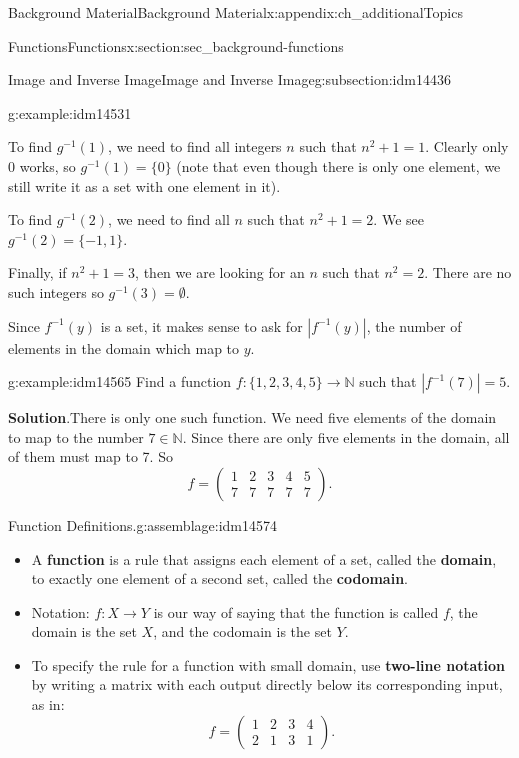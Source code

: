 \documentclass[oneside,10pt,]{book}
\newcommand{\terminology}[1]{\textbf{#1}}
\numberwithin{equation}{chapter}
\def\N{\mathbb N}
\def\inv{^{-1}}
\newcommand{\card}[1]{\left| #1 \right|}
\newcommand{\amp}{&}
\begin{document}
\begin{appendixptx}{Background Material}{}{Background Material}{}{}{x:appendix:ch_additionalTopics}
\begin{sectionptx}{Functions}{}{Functions}{}{}{x:section:sec_background-functions}
\begin{subsectionptx}{Image and Inverse Image}{}{Image and Inverse Image}{}{}{g:subsection:idm14436}
\begin{example}{}{g:example:idm14531}
\par
To find \(g\inv(1)\), we need to find all integers \(n\) such that \(n^2 + 1 = 1\). Clearly only 0 works, so \(g\inv(1) = \{0\}\) (note that even though there is only one element, we still write it as a set with one element in it).%
\par
To find \(g\inv(2)\), we need to find all \(n\) such that \(n^2 + 1 = 2\). We see \(g\inv(2) = \{-1,1\}\).%
\par
Finally, if \(n^2 + 1 = 3\), then we are looking for an \(n\) such that \(n^2 = 2\). There are no such integers so \(g\inv(3) = \emptyset\).%
\end{example}
Since \(f\inv(y)\) is a set, it makes sense to ask for \(\card{f\inv(y)}\), the number of elements in the domain which map to \(y\).%
\begin{example}{}{g:example:idm14565}%
Find a function \(f:\{1,2,3,4,5\} \to \N\) such that \(\card{f\inv(7)} = 5\).%
\par\smallskip%
\noindent\textbf{Solution}.\hypertarget{g:solution:idm14570}{}\quad{}There is only one such function. We need five elements of the domain to map to the number \(7 \in \N\). Since there are only five elements in the domain, all of them must map to 7. So%
\begin{equation*}
f = \begin{pmatrix}1 \amp 2 \amp 3 \amp 4 \amp 5 \\ 7 \amp 7 \amp 7 \amp 7 \amp 7\end{pmatrix}.
\end{equation*}
%
\end{example}
\begin{assemblage}{Function Definitions.}{g:assemblage:idm14574}%
%
\begin{itemize}[label=\textbullet]
\item{}A \terminology{function} is a rule that assigns each element of a set, called the \terminology{domain}, to exactly one element of a second set, called the \terminology{codomain}.%
\item{}Notation: \(f:X \to Y\) is our way of saying that the function is called \(f\), the domain is the set \(X\), and the codomain is the set \(Y\).%
\item{}To specify the rule for a function with small domain, use \terminology{two-line notation} by writing a matrix with each output directly below its corresponding input, as in:%
\begin{equation*}
f = \begin{pmatrix}1 \amp 2 \amp 3 \amp 4 \\ 2 \amp 1 \amp 3 \amp 1 \end{pmatrix}.

\end{equation*}
\end{itemize}
\end{assemblage}
\end{subsectionptx}
\end{sectionptx}
\end{appendixptx}
\end{document}
